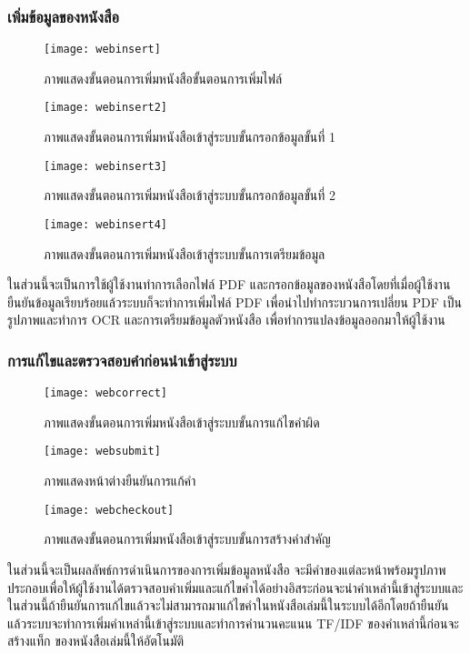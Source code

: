 \subsubsection{เพิ่มข้อมูลของหนังสือ}
\begin{figure}[H]
    \centering
    \texttt{[image: webinsert]}
    \caption{ภาพแสดงขั้นตอนการเพิ่มหนังสือขั้นตอนการเพิ่มไฟล์}\label{fig:webinsert}
\end{figure}
\begin{figure}[H]
    \centering
    \texttt{[image: webinsert2]}
    \caption{ภาพแสดงขั้นตอนการเพิ่มหนังสือเข้าสู่ระบบขั้นกรอกข้อมูลขั้นที่ 1}\label{fig:webinsert2}
\end{figure}
\begin{figure}[H]
    \centering
    \texttt{[image: webinsert3]}
    \caption{ภาพแสดงขั้นตอนการเพิ่มหนังสือเข้าสู่ระบบขั้นกรอกข้อมูลขั้นที่ 2}\label{fig:webinsert3}
\end{figure}

\begin{figure}[H]
    \centering
    \texttt{[image: webinsert4]}
    \caption{ภาพแสดงขั้นตอนการเพิ่มหนังสือเข้าสู่ระบบขั้นการเตรียมข้อมูล}\label{fig:webdel}
\end{figure}
ในส่วนนี้จะเป็นการใช้ผู้ใช้งานทำการเลือกไฟล์ PDF และกรอกข้อมูลของหนังสือโดยที่เมื่อผู้ใช้งานยืนยันข้อมูลเรียบร้อยแล้วระบบก็จะทำการเพิ่มไฟล์ PDF เพื่อนำไปทำกระบวนการเปลี่ยน PDF เป็นรูปภาพและทำการ OCR และการเตรียมข้อมูลตัวหนังสือ  เพื่อทำการแปลงข้อมูลออกมาให้ผู้ใช้งาน

\subsubsection{การแก้ไขและตรวจสอบคำก่อนนำเข้าสู่ระบบ}
\begin{figure}[H]
    \centering
    \texttt{[image: webcorrect]}
    \caption{ภาพแสดงขั้นตอนการเพิ่มหนังสือเข้าสู่ระบบขั้นการแก้ไขคำผิด}\label{fig:webcorrect}
\end{figure}

\begin{figure}[H]
    \centering
    \texttt{[image: websubmit]}
    \caption{ภาพแสดงหน้าต่างยืนยันการแก้คำ}\label{fig:websubmit}
\end{figure}

\begin{figure}[H]
    \centering
    \texttt{[image: webcheckout]}
    \caption{ภาพแสดงขั้นตอนการเพิ่มหนังสือเข้าสู่ระบบขั้นการสร้างคำสำคัญ}\label{fig:webcheckout}
\end{figure}
ในส่วนนี้จะเป็นผลลัพธ์การดำเนินการของการเพิ่มข้อมูลหนังสือ จะมีคำของแต่ละหน้าพร้อมรูปภาพประกอบเพื่อให้ผู้ใช้งานได้ตรวจสอบคำเพิ่มและแก้ไขคำได้อย่างอิสระก่อนจะนำคำเหล่านี้เข้าสู่ระบบและในส่วนนี้ถ้ายืนยันการแก้ไขแล้วจะไม่สามารถมาแก้ไขคำในหนังสือเล่มนี้ในระบบได้อีกโดยถ้ายืนยันแล้วระบบจะทำการเพิ่มคำเหล่านี้เข้าสู่ระบบและทำการคำนวนคะแนน TF/IDF ของคำเหล่านี้ก่อนจะสร้างแท็ก ของหนังสือเล่มนี้ให้อัตโนมัติ


